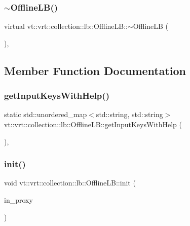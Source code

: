 \subsubsection{\texorpdfstring{$\sim$\+Offline\+L\+B()}{~OfflineLB()}}
{\footnotesize\ttfamily virtual vt\+::vrt\+::collection\+::lb\+::\+Offline\+L\+B\+::$\sim$\+Offline\+LB (\begin{DoxyParamCaption}{ }\end{DoxyParamCaption})\hspace{0.3cm}{\ttfamily [virtual]}, {\ttfamily [default]}}



\subsection{Member Function Documentation}
\mbox{\label{structvt_1_1vrt_1_1collection_1_1lb_1_1_offline_l_b_a64d09cfd5734bc5b6a1e05dfaa0fbe96}} 
\subsubsection{\texorpdfstring{get\+Input\+Keys\+With\+Help()}{getInputKeysWithHelp()}}
{\footnotesize\ttfamily static std\+::unordered\+\_\+map$<$std\+::string, std\+::string$>$ vt\+::vrt\+::collection\+::lb\+::\+Offline\+L\+B\+::get\+Input\+Keys\+With\+Help (\begin{DoxyParamCaption}{ }\end{DoxyParamCaption})\hspace{0.3cm}{\ttfamily [inline]}, {\ttfamily [static]}}

\mbox{\label{structvt_1_1vrt_1_1collection_1_1lb_1_1_offline_l_b_a872df3cf9b5018b990ef9029f7bf9110}} 
\subsubsection{\texorpdfstring{init()}{init()}}
{\footnotesize\ttfamily void vt\+::vrt\+::collection\+::lb\+::\+Offline\+L\+B\+::init (\begin{DoxyParamCaption}\item[{\hyperlink{structvt_1_1objgroup_1_1proxy_1_1_proxy}{objgroup\+::proxy\+::\+Proxy}$<$ \hyperlink{structvt_1_1vrt_1_1collection_1_1lb_1_1_offline_l_b}{Offline\+LB} $>$}]{in\+\_\+proxy }\end{DoxyParamCaption})}

